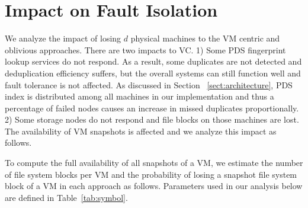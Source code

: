 \section{Impact on Fault Isolation}
\label{sect:fault}
We  analyze  the impact of losing $d$ physical machines 
to the VM centric and oblivious approaches.  
There are two impacts to VC. 
1) Some PDS fingerprint lookup services do not respond.  As  a result, some duplicates
are not detected and deduplication efficiency suffers, but the overall systems can still
function well and fault tolerance is not affected.  As discussed in Section ~\ref{sect:architecture}, 
PDS index is distributed
among all machines in our implementation and thus a percentage of failed nodes
causes an increase in missed duplicates proportionally.
2) Some storage nodes do not  respond and file blocks on those machines are lost. The availability of
VM snapshots is affected and we analyze this impact as follows.


To compute the full availability of all snapshots of a VM, we estimate
the number of file system blocks per VM and the probability of losing a snapshot file system 
block of a VM in each approach as follows.
Parameters used in our analysis below are defined in Table~\ref{tab:symbol}. 

